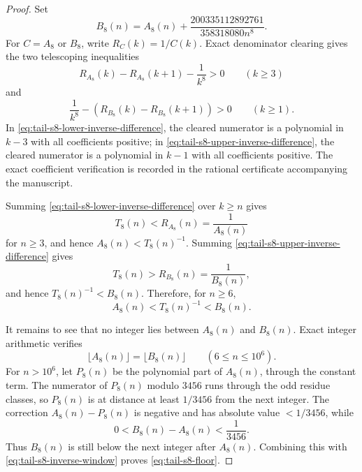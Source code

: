 \documentclass[11pt]{article}
\numberwithin{equation}{section}
\theoremstyle{definition}
\theoremstyle{remark}
\newcommand{\1}{\mathbf 1}
\begin{document}
\begin{proof}
Set
\begin{equation}
\label{eq:tail-s8-b}
B_8(n)=A_8(n)+\frac{200335112892761}{358318080n^8}.
\end{equation}
For \(C=A_8\) or \(B_8\), write \(R_C(k)=1/C(k)\).  Exact denominator clearing gives the two telescoping inequalities
\begin{equation}
\label{eq:tail-s8-lower-inverse-difference}
R_{A_8}(k)-R_{A_8}(k+1)-\frac1{k^8}>0\qquad(k\ge3)
\end{equation}
and
\begin{equation}
\label{eq:tail-s8-upper-inverse-difference}
\frac1{k^8}-\left(R_{B_8}(k)-R_{B_8}(k+1)\right)>0\qquad(k\ge1).
\end{equation}
In \eqref{eq:tail-s8-lower-inverse-difference}, the cleared numerator is a polynomial in \(k-3\) with all coefficients positive; in \eqref{eq:tail-s8-upper-inverse-difference}, the cleared numerator is a polynomial in \(k-1\) with all coefficients positive.  The exact coefficient verification is recorded in the rational certificate accompanying the manuscript.

Summing \eqref{eq:tail-s8-lower-inverse-difference} over \(k\ge n\) gives
\begin{equation}
\label{eq:tail-s8-lower-inverse-sum}
T_8(n)<R_{A_8}(n)=\frac1{A_8(n)}
\end{equation}
for \(n\ge3\), and hence \(A_8(n)<T_8(n)^{-1}\).  Summing \eqref{eq:tail-s8-upper-inverse-difference} gives
\begin{equation}
\label{eq:tail-s8-upper-inverse-sum}
T_8(n)>R_{B_8}(n)=\frac1{B_8(n)},
\end{equation}
and hence \(T_8(n)^{-1}<B_8(n)\).  Therefore, for \(n\ge6\),
\begin{equation}
\label{eq:tail-s8-inverse-window}
A_8(n)<T_8(n)^{-1}<B_8(n).
\end{equation}

It remains to see that no integer lies between \(A_8(n)\) and \(B_8(n)\).  Exact integer arithmetic verifies
\begin{equation}
\label{eq:tail-s8-floor-gap-finite}
\lfloor A_8(n)\rfloor=\lfloor B_8(n)\rfloor\qquad(6\le n\le10^6).
\end{equation}
For \(n>10^6\), let \(P_8(n)\) be the polynomial part of \(A_8(n)\), through the constant term.  The numerator of \(P_8(n)\) modulo \(3456\) runs through the odd residue classes, so \(P_8(n)\) is at distance at least \(1/3456\) from the next integer.  The correction \(A_8(n)-P_8(n)\) is negative and has absolute value \(<1/3456\), while
\begin{equation}
\label{eq:tail-s8-gap-small}
0<B_8(n)-A_8(n)<\frac1{3456}.
\end{equation}
Thus \(B_8(n)\) is still below the next integer after \(A_8(n)\).  Combining this with \eqref{eq:tail-s8-inverse-window} proves \eqref{eq:tail-s8-floor}.


\end{proof}
\end{document}
